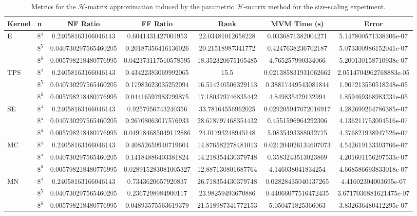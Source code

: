 \documentclass[final,3p,times]{elsarticle}
\newcommand{\mc}[1]{\mathcal{#1}}
\begin{document}
\begin{table}[!ht]
\centering
\scriptsize
\begin{tabular}{llSSSSS}
\hline
\textbf{Kernel} & \textbf{n} & \textbf{NF Ratio} & \textbf{FF Ratio} & \textbf{Rank} & \textbf{MVM Time (s)} & \textbf{Error} \\
\hline
        E & $8^4$ & 0.24058163166046143 & 0.6041431427001953 & 22.03481012658228 & 0.0336871382004271 & 5.147800571338306e-07 \\ 
         & $8^5$ & 0.040730297565460205 & 0.20187356416136026 & 20.21518987341772 & 0.4247638236702187 & 5.073300986152041e-07 \\ 
         & $8^6$ & 0.005798218480776995 & 0.042373117510578595 & 18.352320675105485 & 4.765257990334066 & 5.200130158710938e-07 \\ \hline
        TPS & $8^4$ & 0.24058163166046143 & 0.43422383069992065 & 15.5 & 0.021385831931062662 & 2.0514704962768883e-05 \\ 
         & $8^5$ & 0.040730297565460205 & 0.17983623035252094 & 16.514240506329113 & 0.38817449543081844 & 1.907213550518248e-05 \\ 
         & $8^6$ & 0.005798218480776995 & 0.04416597983799875 & 17.180379746835442 & 4.849835429132994 & 1.859469368983231e-05 \\ \hline
        SE & $8^4$ & 0.24058163166046143 & 0.9257956743240356 & 33.78164556962025 & 0.029205947672016917 & 4.282699264786385e-07 \\ 
         & $8^5$ & 0.040730297565460205 & 0.26708063017576933 & 28.678797468354432 & 0.4551596964292306 & 4.136211753004516e-07 \\ 
         & $8^6$ & 0.005798218480776995 & 0.049184685049112886 & 24.01793248945148 & 5.0835493388032775 & 4.376821938947526e-07 \\ \hline
        MC & $8^4$ & 0.24058163166046143 & 0.40852659940719604 & 14.876582278481013 & 0.021204026134607073 & 4.542619133393766e-07 \\ 
         & $8^5$ & 0.040730297565460205 & 0.14184886403381824 & 14.218354430379748 & 0.3583243513023869 & 4.201601156297533e-07 \\ 
         & $8^6$ & 0.005798218480776995 & 0.028915283081005327 & 12.887130801687764 & 4.146038041834254 & 4.668586693833018e-07 \\ \hline
        MN & $8^4$ & 0.24058163166046143 & 0.7343620657920837 & 26.718354430379748 & 0.02828435040137265 & 4.41602304003695e-07 \\ 
         & $8^5$ & 0.040730297565460205 & 0.2367298984900117 & 23.98259493670886 & 0.44066077516472435 & 3.6717036881621475e-07 \\ 
         & $8^6$ & 0.005798218480776995 & 0.04893575563619379 & 21.518987341772153 & 5.050471825366063 & 3.832636480412295e-07 \\ \hline
\end{tabular}
\caption{Metrics for the $\mc{H}$-matrix approximation induced by the parametric $\mc{H}$-matrix method for the size-scaling experiment.}
\label{tab:ph_matrix_induced}
\end{table}
\end{document}
